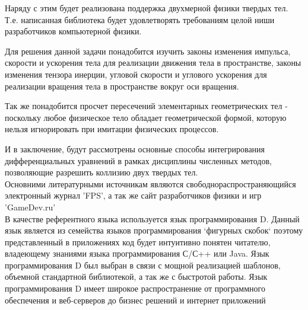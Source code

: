 Наряду с этим будет реализована поддержка двухмерной физики твердых тел.
Т.е. написанная библиотека будет удовлетворять требованиям целой ниши 
разработчиков компьютерной физики.

Для решения данной задачи понадобится изучить законы изменения
импульса, скорости и ускорения тела для реализации движения тела в пространстве,
законы изменения тензора инерции, угловой скорости и углового ускорения 
для реализации вращения тела в пространстве вокруг оси вращения.

Так же понадобится просчет пересечений элементарных 
геометрических тел - поскольку любое физическое тело обладает
геометрической формой, которую нельзя игнорировать при имитации 
физических процессов.

И в заключение, будут рассмотрены основные способы интегрирования
дифференциальных уравнений в рамках дисциплины численных методов,
позволяющие разрешить коллизию двух твердых тел.
\\

Основними литературными источникам являются свободнораспространяющийся
электронный журнал 'FPS', а так же сайт разработчиков физики и игр 'GameDev.ru'
\\

В качестве референтного языка используется язык программирования D.
Данный язык является из семейства языков программирования `фигурных скобок`
поэтому представленный в приложениях код будет интуитивно понятен читателю,
владеющему знаниями языка программирования С/С++ или Java.
Язык программирования D был выбран в связи с мощной реализацией шаблонов,
объемной стандартной библиотекой, а так же с быстротой работы.
Язык программирования D имеет широкое распространение от программного обеспечения и веб-серверов
до бизнес решений и интернет приложений